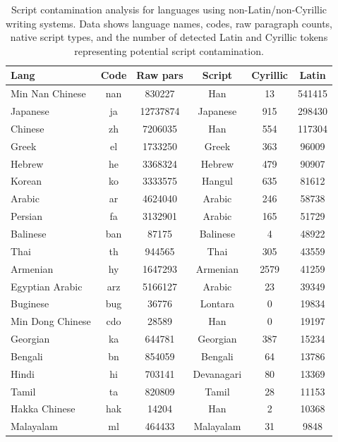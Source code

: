 \documentclass[11pt]{article}
\begin{document}
\begin{table}[ht]
    \caption{Script contamination analysis for languages using non-Latin/non-Cyrillic writing systems. Data shows language names, codes, raw paragraph counts, native script types, and the number of detected Latin and Cyrillic tokens representing potential script contamination.}
    \label{tab:additional_languages}
    \centering
    \small
    \renewcommand{\arraystretch}{1.1}
    \begin{tabular}{l c c c c c}
        \toprule
        \textbf{Lang} & \textbf{Code} & \textbf{Raw pars} & \textbf{Script} & \textbf{Cyrillic} & \textbf{Latin} \\
        \midrule
        Min Nan Chinese & nan & 830227 & Han & 13 & 541415 \\
        Japanese & ja & 12737874 & Japanese & 915 & 298430 \\
        Chinese & zh & 7206035 & Han & 554 & 117304 \\
        Greek & el & 1733250 & Greek & 363 & 96009 \\
        Hebrew & he & 3368324 & Hebrew & 479 & 90907 \\
        Korean & ko & 3333575 & Hangul & 635 & 81612 \\
        Arabic & ar & 4624040 & Arabic & 246 & 58738 \\
        Persian & fa & 3132901 & Arabic & 165 & 51729 \\
        Balinese & ban & 87175 & Balinese & 4 & 48922 \\
        Thai & th & 944565 & Thai & 305 & 43559 \\
        Armenian & hy & 1647293 & Armenian & 2579 & 41259 \\
        Egyptian Arabic & arz & 5166127 & Arabic & 23 & 39349 \\
        Buginese & bug & 36776 & Lontara & 0 & 19834 \\
        Min Dong Chinese & cdo & 28589 & Han & 0 & 19197 \\
        Georgian & ka & 644781 & Georgian & 387 & 15234 \\
        Bengali & bn & 854059 & Bengali & 64 & 13786 \\
        Hindi & hi & 703141 & Devanagari & 80 & 13369 \\
        Tamil & ta & 820809 & Tamil & 28 & 11153 \\
        Hakka Chinese & hak & 14204 & Han & 2 & 10368 \\
        Malayalam & ml & 464433 & Malayalam & 31 & 9848 \\

\end{tabular}
\end{table}
\end{document}
